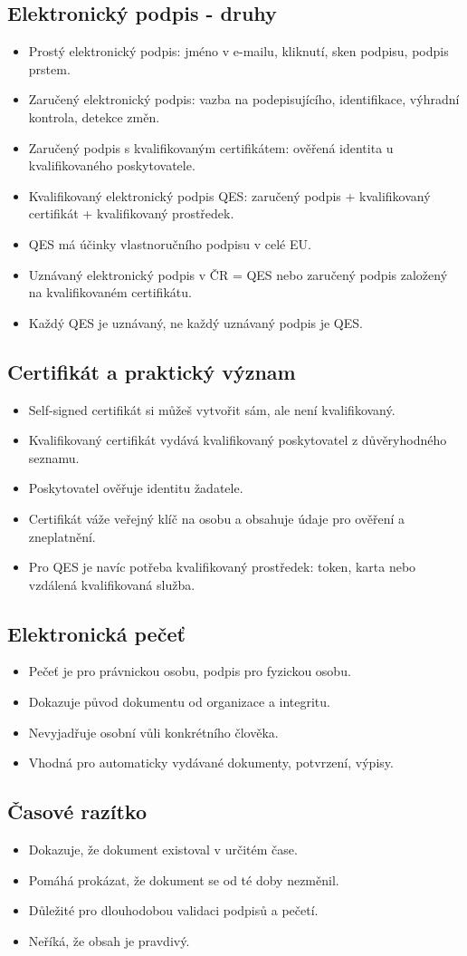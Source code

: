 \documentclass[10pt,a4paper]{article}
\newcommand{\blok}[1]{\subsection*{#1}}
\begin{document}
\blok{Elektronický podpis - druhy}
\begin{itemize}
  \item Prostý elektronický podpis: jméno v e-mailu, kliknutí, sken podpisu, podpis prstem.
  \item Zaručený elektronický podpis: vazba na podepisujícího, identifikace, výhradní kontrola, detekce změn.
  \item Zaručený podpis s kvalifikovaným certifikátem: ověřená identita u kvalifikovaného poskytovatele.
  \item Kvalifikovaný elektronický podpis QES: zaručený podpis + kvalifikovaný certifikát + kvalifikovaný prostředek.
  \item QES má účinky vlastnoručního podpisu v celé EU.
  \item Uznávaný elektronický podpis v ČR = QES nebo zaručený podpis založený na kvalifikovaném certifikátu.
  \item Každý QES je uznávaný, ne každý uznávaný podpis je QES.
\end{itemize}

\blok{Certifikát a praktický význam}
\begin{itemize}
  \item Self-signed certifikát si můžeš vytvořit sám, ale není kvalifikovaný.
  \item Kvalifikovaný certifikát vydává kvalifikovaný poskytovatel z důvěryhodného seznamu.
  \item Poskytovatel ověřuje identitu žadatele.
  \item Certifikát váže veřejný klíč na osobu a obsahuje údaje pro ověření a zneplatnění.
  \item Pro QES je navíc potřeba kvalifikovaný prostředek: token, karta nebo vzdálená kvalifikovaná služba.
\end{itemize}

\blok{Elektronická pečeť}
\begin{itemize}
  \item Pečeť je pro právnickou osobu, podpis pro fyzickou osobu.
  \item Dokazuje původ dokumentu od organizace a integritu.
  \item Nevyjadřuje osobní vůli konkrétního člověka.
  \item Vhodná pro automaticky vydávané dokumenty, potvrzení, výpisy.
\end{itemize}

\blok{Časové razítko}
\begin{itemize}
  \item Dokazuje, že dokument existoval v určitém čase.
  \item Pomáhá prokázat, že dokument se od té doby nezměnil.
  \item Důležité pro dlouhodobou validaci podpisů a pečetí.
  \item Neříká, že obsah je pravdivý.
\end{itemize}
\end{document}
